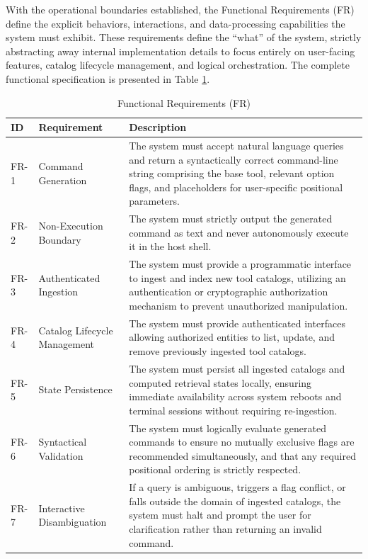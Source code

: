 \FloatBarrier

With the operational boundaries established, the Functional Requirements (FR) define the explicit behaviors, interactions, and data-processing capabilities the system must exhibit. These requirements define the \enquote{what} of the system, strictly abstracting away internal implementation details to focus entirely on user-facing features, catalog lifecycle management, and logical orchestration. The complete functional specification is presented in Table \ref{tab:functional_reqs}.

\begin{table}[htbp]
    \centering
    \caption{Functional Requirements (FR)}
    \label{tab:functional_reqs}
    \renewcommand{\arraystretch}{1.3}
    \begin{tabularx}{\textwidth}{@{} l l X @{}}
        \toprule
        \textbf{ID} & \textbf{Requirement} & \textbf{Description} \\
        \midrule
        FR-1 & Command Generation & The system must accept natural language queries and return a syntactically correct command-line string comprising the base tool, relevant option flags, and placeholders for user-specific positional parameters. \\
        FR-2 & Non-Execution Boundary & The system must strictly output the generated command as text and never autonomously execute it in the host shell. \\
        FR-3 & Authenticated Ingestion & The system must provide a programmatic interface to ingest and index new tool catalogs, utilizing an authentication or cryptographic authorization mechanism to prevent unauthorized manipulation. \\
        FR-4 & Catalog Lifecycle Management & The system must provide authenticated interfaces allowing authorized entities to list, update, and remove previously ingested tool catalogs. \\
        FR-5 & State Persistence & The system must persist all ingested catalogs and computed retrieval states locally, ensuring immediate availability across system reboots and terminal sessions without requiring re-ingestion. \\
        FR-6 & Syntactical Validation & The system must logically evaluate generated commands to ensure no mutually exclusive flags are recommended simultaneously, and that any required positional ordering is strictly respected. \\
        FR-7 & Interactive Disambiguation & If a query is ambiguous, triggers a flag conflict, or falls outside the domain of ingested catalogs, the system must halt and prompt the user for clarification rather than returning an invalid command. \\

\end{tabularx}
\end{table}
